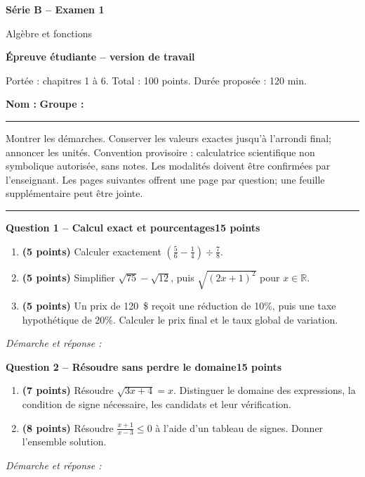 \documentclass[11pt,a4paper]{article}
\begin{document}
{\LARGE\bfseries Série B -- Examen 1}\par
{\large Algèbre et fonctions}\par
\textbf{Épreuve étudiante -- version de travail}\par
Portée : chapitres 1 à 6. Total : 100 points. Durée proposée : 120 min.\par
\textbf{Nom :} \hrulefill\quad \textbf{Groupe :} \rule{22mm}{0.3pt}\par
\small Montrer les démarches. Conserver les valeurs exactes jusqu’à l’arrondi final; annoncer les unités. Convention provisoire : calculatrice scientifique non symbolique autorisée, sans notes. Les modalités doivent être confirmées par l’enseignant. Les pages suivantes offrent une page par question; une feuille supplémentaire peut être jointe.\normalsize\par
\vspace{3mm}\hrule\vspace{4mm}
{\large\bfseries Question 1 -- Calcul exact et pourcentages}\hfill\textbf{15 points}\par
\begin{enumerate}
\item \textbf{(5 points)} Calculer exactement \(\left(\frac56-\frac14\right)\div\frac78\).
\item \textbf{(5 points)} Simplifier \(\sqrt{75}-\sqrt{12}\), puis \(\sqrt{(2x+1)^2}\) pour \(x\in\mathbb R\).
\item \textbf{(5 points)} Un prix de 120~\$ reçoit une réduction de 10\%, puis une taxe hypothétique de 20\%. Calculer le prix final et le taux global de variation.
\end{enumerate}
\vspace{3mm}\textit{Démarche et réponse :}\par\vfill

\newpage
{\large\bfseries Question 2 -- Résoudre sans perdre le domaine}\hfill\textbf{15 points}\par
\begin{enumerate}
\item \textbf{(7 points)} Résoudre \(\sqrt{3x+4}=x\). Distinguer le domaine des expressions, la condition de signe nécessaire, les candidats et leur vérification.
\item \textbf{(8 points)} Résoudre \(\frac{x+1}{x-3}\le0\) à l’aide d’un tableau de signes. Donner l’ensemble solution.
\end{enumerate}
\vspace{3mm}\textit{Démarche et réponse :}\par\vfill
\end{document}
